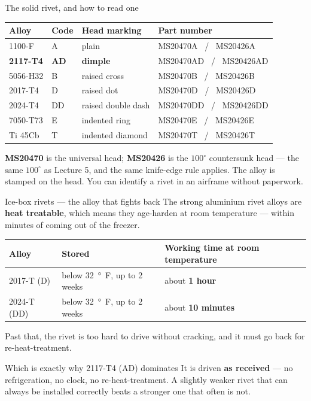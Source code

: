 \documentclass[aspectratio=169,10pt]{beamer}
\begin{document}
\begin{frame}{The solid rivet, and how to read one}
\centering\footnotesize
\begin{tabular}{@{}llll@{}}
\toprule
Alloy & Code & Head marking & Part number\\
\midrule
1100-F & A & plain & MS20470A \ / \ MS20426A\\
\textbf{2117-T4} & \textbf{AD} & \textbf{dimple} & MS20470AD \ / \ MS20426AD\\
5056-H32 & B & raised cross & MS20470B \ / \ MS20426B\\
2017-T4 & D & raised dot & MS20470D \ / \ MS20426D\\
2024-T4 & DD & raised double dash & MS20470DD \ / \ MS20426DD\\
7050-T73 & E & indented ring & MS20470E \ / \ MS20426E\\
Ti 45Cb & T & indented diamond & MS20470T \ / \ MS20426T\\
\bottomrule
\end{tabular}
\vfill
\raggedright
\textbf{MS20470} is the universal head; \textbf{MS20426} is the $100^\circ$ countersunk head ---
the same $100^\circ$ as Lecture 5, and the same knife-edge rule applies.
\vfill
\centering
\alert{The alloy is stamped on the head.} You can identify a rivet in an airframe without paperwork.
\end{frame}

\begin{frame}{Ice-box rivets --- the alloy that fights back}
The strong aluminium rivet alloys are \textbf{heat treatable}, which means they \alert{age-harden at
room temperature} --- within minutes of coming out of the freezer.
\vfill
\centering\small
\begin{tabular}{@{}lll@{}}
\toprule
Alloy & Stored & Working time at room temperature\\
\midrule
2017-T (D) & below \SI{32}{\degree F}, up to 2 weeks & about \textbf{1 hour}\\
2024-T (DD) & below \SI{32}{\degree F}, up to 2 weeks & about \textbf{10 minutes}\\
\bottomrule
\end{tabular}
\vfill
\raggedright
Past that, the rivet is too hard to drive without cracking, and it must go back for
re-heat-treatment.
\vfill
\begin{alertblock}{Which is exactly why 2117-T4 (AD) dominates}
It is driven \textbf{as received} --- no refrigeration, no clock, no re-heat-treatment. A slightly
weaker rivet that can always be installed correctly beats a stronger one that often is not.
\end{alertblock}
\end{frame}
\end{document}

